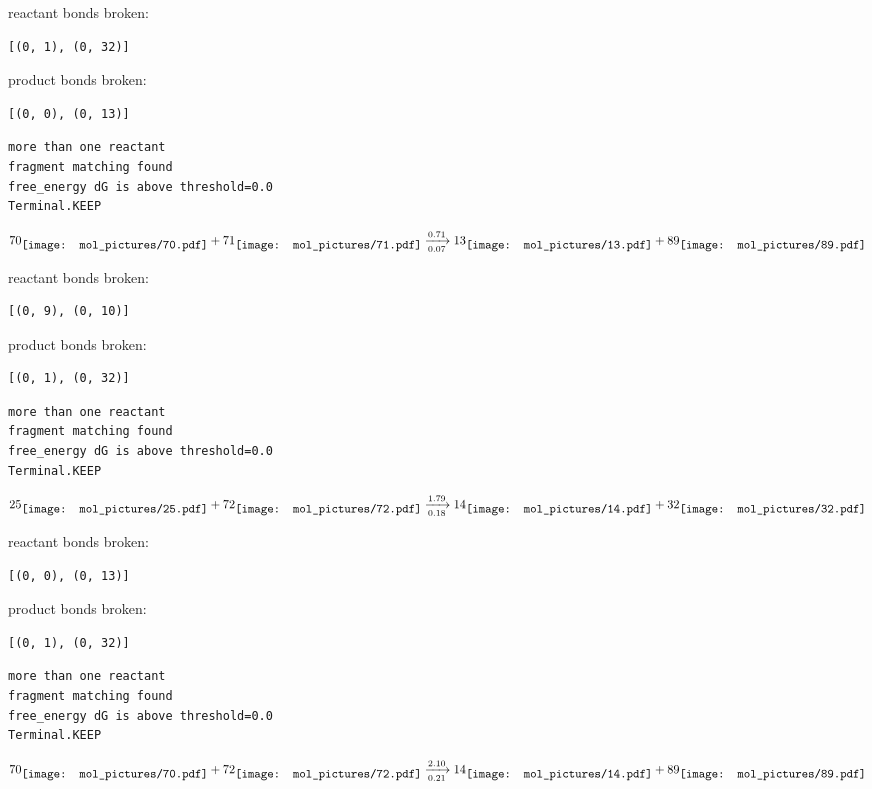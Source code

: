 \documentclass{article}
\begin{document}
reactant bonds broken:\begin{verbatim}
[(0, 1), (0, 32)]
\end{verbatim}
product bonds broken:\begin{verbatim}
[(0, 0), (0, 13)]
\end{verbatim}




\vspace{1cm}
\begin{verbatim}
more than one reactant
fragment matching found
free_energy dG is above threshold=0.0
Terminal.KEEP
\end{verbatim}
$$
70
\raisebox{-.5\height}{\texttt{[image: mol\_pictures/70.pdf]}}
+
71
\raisebox{-.5\height}{\texttt{[image: mol\_pictures/71.pdf]}}
\xrightarrow[0.07]{0.71}
13
\raisebox{-.5\height}{\texttt{[image: mol\_pictures/13.pdf]}}
+
89
\raisebox{-.5\height}{\texttt{[image: mol\_pictures/89.pdf]}}
$$


reactant bonds broken:\begin{verbatim}
[(0, 9), (0, 10)]
\end{verbatim}
product bonds broken:\begin{verbatim}
[(0, 1), (0, 32)]
\end{verbatim}




\vspace{1cm}
\begin{verbatim}
more than one reactant
fragment matching found
free_energy dG is above threshold=0.0
Terminal.KEEP
\end{verbatim}
$$
25
\raisebox{-.5\height}{\texttt{[image: mol\_pictures/25.pdf]}}
+
72
\raisebox{-.5\height}{\texttt{[image: mol\_pictures/72.pdf]}}
\xrightarrow[0.18]{1.79}
14
\raisebox{-.5\height}{\texttt{[image: mol\_pictures/14.pdf]}}
+
32
\raisebox{-.5\height}{\texttt{[image: mol\_pictures/32.pdf]}}
$$


reactant bonds broken:\begin{verbatim}
[(0, 0), (0, 13)]
\end{verbatim}
product bonds broken:\begin{verbatim}
[(0, 1), (0, 32)]
\end{verbatim}




\vspace{1cm}
\begin{verbatim}
more than one reactant
fragment matching found
free_energy dG is above threshold=0.0
Terminal.KEEP
\end{verbatim}
$$
70
\raisebox{-.5\height}{\texttt{[image: mol\_pictures/70.pdf]}}
+
72
\raisebox{-.5\height}{\texttt{[image: mol\_pictures/72.pdf]}}
\xrightarrow[0.21]{2.10}
14
\raisebox{-.5\height}{\texttt{[image: mol\_pictures/14.pdf]}}
+
89
\raisebox{-.5\height}{\texttt{[image: mol\_pictures/89.pdf]}}
$$
\end{document}
